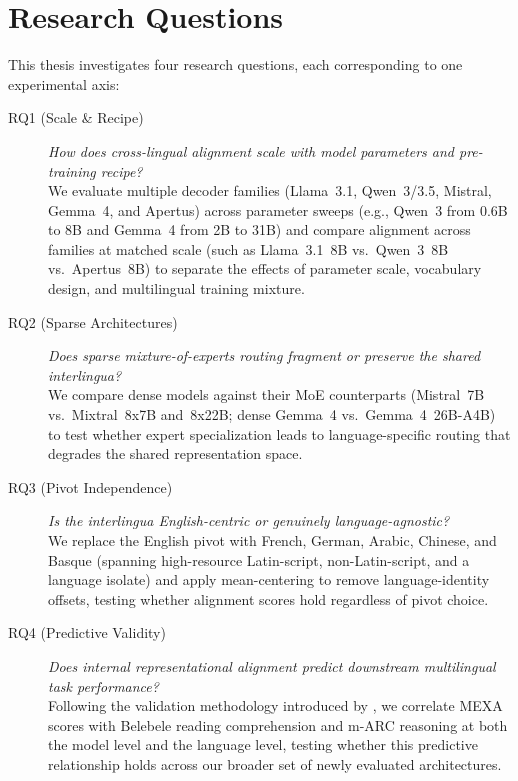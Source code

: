 \section{Research Questions}
\label{sec:intro-research-questions}

This thesis investigates four research questions, each corresponding to one experimental axis:

\begin{description}
    \item[RQ1 (Scale \& Recipe)] \emph{How does cross-lingual alignment scale with model parameters and pre-training recipe?} \\
    We evaluate multiple decoder families (Llama~3.1, Qwen~3/3.5, Mistral, Gemma~4, and Apertus) across parameter sweeps (e.g., Qwen~3 from 0.6B to 8B and Gemma~4 from 2B to 31B) and compare alignment across families at matched scale (such as Llama~3.1~8B vs.\ Qwen~3~8B vs.\ Apertus~8B) to separate the effects of parameter scale, vocabulary design, and multilingual training mixture.

    \item[RQ2 (Sparse Architectures)] \emph{Does sparse mixture-of-experts routing fragment or preserve the shared interlingua?} \\
    We compare dense models against their MoE counterparts (Mistral~7B vs.\ Mixtral~8x7B and~8x22B; dense Gemma~4 vs.\ Gemma~4~26B-A4B) to test whether expert specialization leads to language-specific routing that degrades the shared representation space.

    \item[RQ3 (Pivot Independence)] \emph{Is the interlingua English-centric or genuinely language-agnostic?} \\
    We replace the English pivot with French, German, Arabic, Chinese, and Basque (spanning high-resource Latin-script, non-Latin-script, and a language isolate) and apply mean-centering to remove language-identity offsets, testing whether alignment scores hold regardless of pivot choice.

    \item[RQ4 (Predictive Validity)] \emph{Does internal representational alignment predict downstream multilingual task performance?} \\
    Following the validation methodology introduced by \citet{kargaran2025mexa}, we correlate MEXA scores with Belebele reading comprehension \citep{bandarkar2024belebele} and m-ARC reasoning \citep{lai2023okapi} at both the model level and the language level, testing whether this predictive relationship holds across our broader set of newly evaluated architectures.
\end{description}


